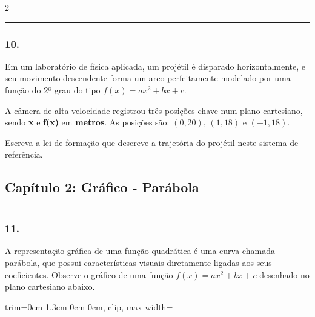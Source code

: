 \documentclass[twoside, 10pt, a4paper]{article}
\newlength{\espacoPosTitulo}
\newlength{\espacoPreQuestao}
\newlength{\espacoQuestao}
\newlength{\larguraTikz}
\begin{document}
\begin{multicols*}{2}
\noindent\textcolor{CorLinha}{\rule{\linewidth}{0.5pt}} 
\par\vspace{\espacoPreQuestao}
\subsubsection*{10.} Em um laboratório de física aplicada, um projétil é disparado horizontalmente, e seu movimento descendente forma um arco perfeitamente modelado por uma função do 2º grau do tipo $f(x) = ax^2 + bx + c$.

A câmera de alta velocidade registrou três posições chave num plano cartesiano, sendo \textbf{x} e \textbf{f(x)} em \textbf{metros}. As posições são: $(0, 20)$, $(1, 18)$ e $(-1, 18)$. 

Escreva a lei de formação que descreve a trajetória do projétil neste sistema de referência.
\par\vspace{\espacoQuestao}
\subsection*{Capítulo 2: Gráfico - Parábola}
\vspace{-0.2cm}\noindent\rule{\linewidth}{1.5pt} 
\par\vspace{\espacoPosTitulo}
\subsubsection*{11.} A representação gráfica de uma função quadrática é uma curva chamada parábola, que possui características visuais diretamente ligadas aos seus coeficientes. Observe o gráfico de uma função $f(x) = ax^2 + bx + c$ desenhado no plano cartesiano abaixo.

\begin{center}
\begin{adjustbox}{trim=0cm 1.3cm 0cm 0cm, clip, max width=\larguraTikz}
\end{adjustbox}
\end{center}
\end{multicols*}
\end{document}

